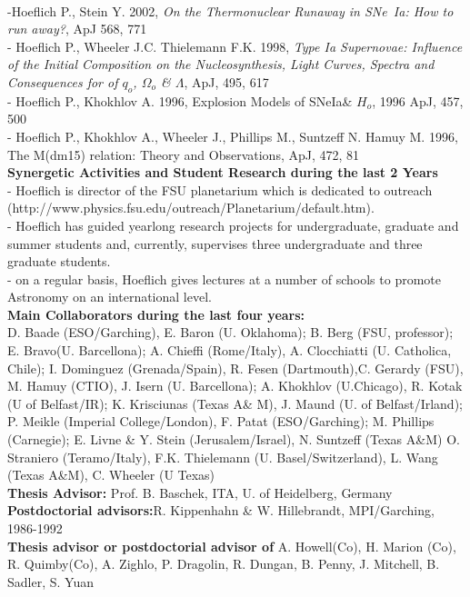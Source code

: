       \\
\noindent
-Hoeflich P., Stein Y. 2002,
{\sl On the Thermonuclear Runaway in SNe~Ia: How to run away?},
{ApJ 568}, 771                                              \\
\noindent 
- Hoeflich P., Wheeler J.C.    Thielemann F.K. 1998,
{\sl Type Ia Supernovae: Influence of the Initial Composition on the 
Nucleosynthesis, Light Curves, Spectra and Consequences for 
of $q_o$, $\Omega _o$ \& $\Lambda$}, { ApJ}, { 495}, 617      \\                                         
\noindent 
- Hoeflich P., Khokhlov A. 1996, {Explosion Models of SNeIa\& $H_o$, 1996 { ApJ}, 457, 500  \\
\noindent 
- Hoeflich P., Khokhlov A., Wheeler J., Phillips M., Suntzeff N. Hamuy M.  1996, {The M(dm15) relation: Theory and Observations,  {ApJ}, 472, 81   \\

\noindent
{\large\bf Synergetic Activities and Student Research during the last 2 Years}   \\
- Hoeflich is director of the FSU planetarium which is dedicated to outreach
 (http://www.physics.fsu.edu/outreach/Planetarium/default.htm).                    \\
- Hoeflich has guided yearlong research projects for undergraduate, graduate and summer students
 and, currently, supervises three undergraduate and three graduate students.          \\
- on a regular basis, Hoeflich gives lectures at a number of schools to promote Astronomy on an
international level.                                                                    \\

\noindent
{\large\bf Main Collaborators during the last four years:}   \\
D. Baade (ESO/Garching),
E. Baron (U. Oklahoma);
B. Berg  (FSU, professor);
E. Bravo(U. Barcellona);
A. Chieffi (Rome/Italy),
A. Clocchiatti (U. Catholica, Chile);
  I. Dominguez (Grenada/Spain),
R. Fesen (Dartmouth),C. Gerardy (FSU), 
M. Hamuy (CTIO),
J. Isern (U. Barcellona);
A. Khokhlov (U.Chicago), 
R. Kotak (U of Belfast/IR);
K. Krisciunas (Texas A\& M),
J. Maund (U. of Belfast/Irland);
P. Meikle (Imperial College/London),
F. Patat (ESO/Garching);
M. Phillips (Carnegie);
 E. Livne \& Y. Stein (Jerusalem/Israel), N. Suntzeff (Texas A\&M)
O. Straniero (Teramo/Italy),  F.K. Thielemann (U. Basel/Switzerland),
 L. Wang (Texas A\&M),
C. Wheeler (U Texas)                                           \\
\noindent
 {\large\bf Thesis Advisor:} Prof. B. Baschek, ITA, U. of Heidelberg, Germany  \\
 {\large\bf Postdoctorial advisors:}R. Kippenhahn \& W. Hillebrandt,
   MPI/Garching, 1986-1992}                                             \\
 {\large\bf Thesis advisor or postdoctorial advisor of} A. Howell(Co), H. Marion (Co), R. Quimby(Co), A. Zighlo,
  P. Dragolin, R. Dungan, B. Penny, J. Mitchell, B. Sadler, S. Yuan}      \\



